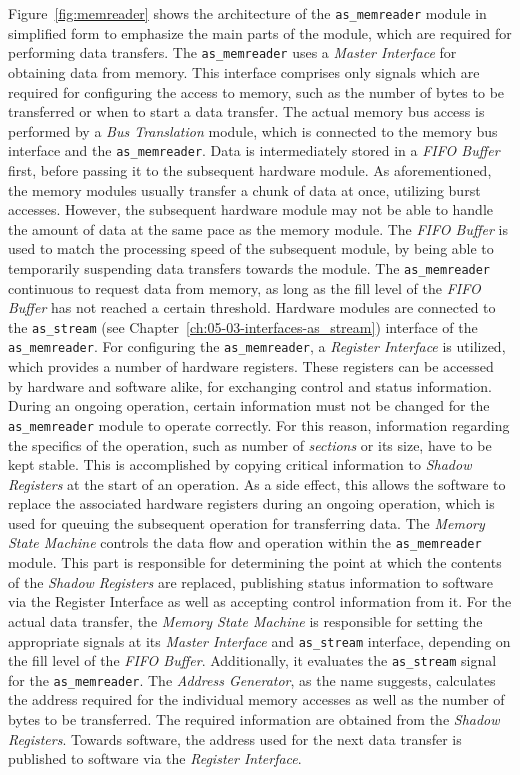 Figure~\ref{fig:memreader} shows the architecture of the \texttt{as\_memreader} module in simplified form to emphasize the main parts of the module, which are required for performing data transfers. 
The \texttt{as\_memreader} uses a \textit{Master Interface} for obtaining data from memory. 
This interface comprises only signals which are required for configuring the access to memory, such as the number of bytes to be transferred or when to start a data transfer. 
The actual memory bus access is performed by a \textit{Bus Translation} module, which is connected to the memory bus interface and the \texttt{as\_memreader}. 
Data is intermediately stored in a \textit{FIFO Buffer} first, before passing it to the subsequent hardware module. 
As aforementioned, the memory modules usually transfer a chunk of data at once, utilizing burst accesses. 
However, the subsequent hardware module may not be able to handle the amount of data at the same pace as the memory module. 
The \textit{FIFO Buffer} is used to match the processing speed of the subsequent module, by being able to temporarily suspending data transfers towards the module. 
The \texttt{as\_memreader} continuous to request data from memory, as long as the fill level of the \textit{FIFO Buffer} has not reached a certain threshold. 
Hardware modules are connected to the \texttt{as\_stream} (see Chapter~\ref{ch:05-03-interfaces-as_stream}) interface of the \texttt{as\_memreader}. 
For configuring the \texttt{as\_memreader}, a \textit{Register Interface} is utilized, which provides a number of hardware registers. 
These registers can be accessed by hardware and software alike, for exchanging control and status information. 
During an ongoing operation, certain information must not be changed for the \texttt{as\_memreader} module to operate correctly. 
For this reason, information regarding the specifics of the operation, such as number of \textit{sections} or its size, have to be kept stable. 
This is accomplished by copying critical information to \textit{Shadow Registers} at the start of an operation. 
As a side effect, this allows the software to replace the associated hardware registers during an ongoing operation, which is used for queuing the subsequent operation for transferring data. 
The \textit{Memory State Machine} controls the data flow and operation within the \texttt{as\_memreader} module. 
This part is responsible for determining the point at which the contents of the \textit{Shadow Registers} are replaced, publishing
status information to software via the Register Interface as well as accepting control information from it. 
For the actual data transfer, the \textit{Memory State Machine} is responsible for setting the appropriate signals at its \textit{Master Interface} and \texttt{as\_stream} interface, depending on the fill level of the \textit{FIFO Buffer}. 
Additionally, it evaluates the \texttt{as\_stream} signal for the \texttt{as\_memreader}. 
The \textit{Address Generator}, as the name suggests, calculates the address required for the individual memory accesses as well as the number of bytes to be transferred. 
The required information are obtained from the \textit{Shadow Registers}. 
Towards software, the address used for the next data transfer is published to software via the \textit{Register Interface}.

